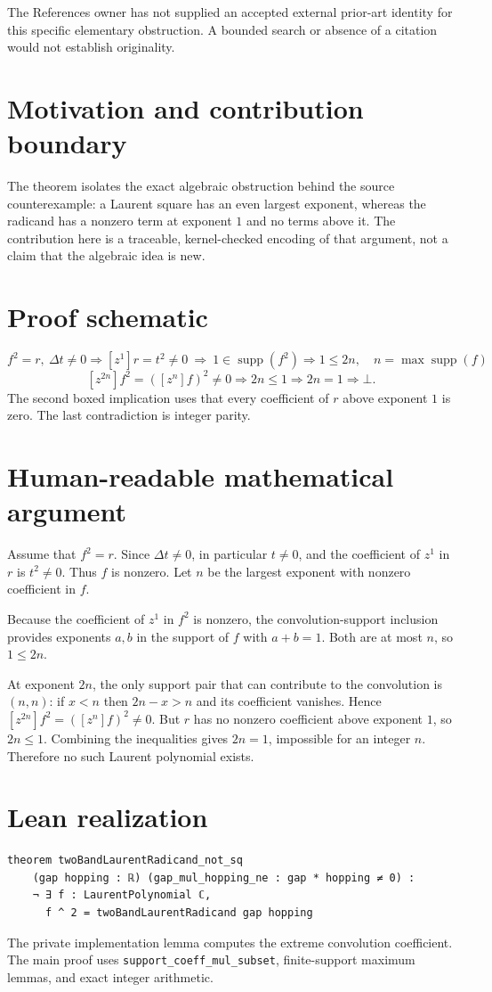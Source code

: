 \documentclass[11pt]{article}
\begin{document}
The References owner has not supplied an accepted external prior-art identity for this
specific elementary obstruction. A bounded search or absence of a citation would not
establish originality.

\section{Motivation and contribution boundary}
The theorem isolates the exact algebraic obstruction behind the source counterexample:
a Laurent square has an even largest exponent, whereas the radicand has a nonzero term at
exponent $1$ and no terms above it. The contribution here is a traceable, kernel-checked
encoding of that argument, not a claim that the algebraic idea is new.

\section{Proof schematic}
\[
\boxed{f^2=r,\ \Delta t\ne0}
\Longrightarrow
\boxed{[z^1]r=t^2\ne0\ \Longrightarrow\ 1\in\operatorname{supp}(f^2)}
\Longrightarrow
\boxed{1\le2n,\quad n=\max\operatorname{supp}(f)}
\]
\[
\boxed{[z^{2n}]f^2=([z^n]f)^2\ne0}
\Longrightarrow
\boxed{2n\le1}
\Longrightarrow
\boxed{2n=1}
\Longrightarrow\bot.
\]
The second boxed implication uses that every coefficient of $r$ above exponent $1$ is
zero. The last contradiction is integer parity.

\section{Human-readable mathematical argument}
Assume that $f^2=r$. Since $\Delta t\ne0$, in particular $t\ne0$, and the coefficient
of $z^1$ in $r$ is $t^2\ne0$. Thus $f$ is nonzero. Let $n$ be the largest exponent with
nonzero coefficient in $f$.

Because the coefficient of $z^1$ in $f^2$ is nonzero, the convolution-support inclusion
provides exponents $a,b$ in the support of $f$ with $a+b=1$. Both are at most $n$, so
$1\le2n$.

At exponent $2n$, the only support pair that can contribute to the convolution is
$(n,n)$: if $x<n$ then $2n-x>n$ and its coefficient vanishes. Hence
$[z^{2n}]f^2=([z^n]f)^2\ne0$. But $r$ has no nonzero coefficient above exponent $1$,
so $2n\le1$. Combining the inequalities gives $2n=1$, impossible for an integer $n$.
Therefore no such Laurent polynomial exists.

\section{Lean realization}
\begin{lstlisting}
theorem twoBandLaurentRadicand_not_sq
    (gap hopping : ℝ) (gap_mul_hopping_ne : gap * hopping ≠ 0) :
    ¬ ∃ f : LaurentPolynomial ℂ,
      f ^ 2 = twoBandLaurentRadicand gap hopping
\end{lstlisting}
The private implementation lemma computes the extreme convolution coefficient. The main
proof uses \texttt{support\_coeff\_mul\_subset}, finite-support maximum lemmas, and exact
integer arithmetic.
\end{document}
